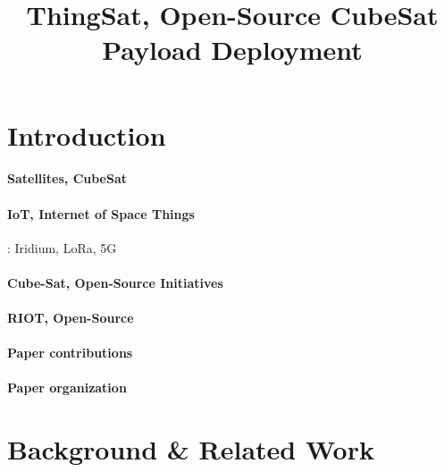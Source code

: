 \documentclass[conference]{IEEEtran}
\begin{document}

\title{ThingSat, Open-Source CubeSat Payload Deployment}

\author{
    }

\maketitle

\begin{abstract}

\end{abstract}

\IEEEpeerreviewmaketitle

\section{Introduction}
\label{sec:introduction}

\paragraph*{Satellites, CubeSat}
\paragraph*{IoT, Internet of Space Things}: Iridium, LoRa, 5G
\paragraph*{Cube-Sat, Open-Source Initiatives}
\paragraph*{RIOT, Open-Source}
\paragraph*{Paper contributions}
\paragraph*{Paper organization}

\section{Background \& Related Work}
\label{sec:background-related-work}
\end{document}
